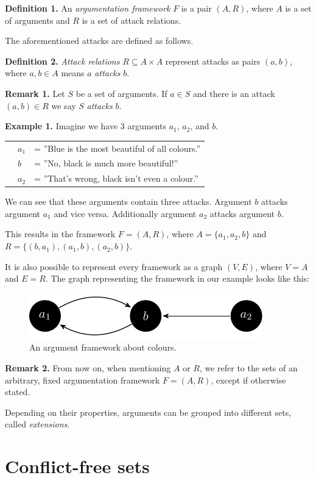 \documentclass[draft,final]{vutinfth} %
\newcommand{\hl}{\par\vspace{6pt}} %
\newcommand{\cl}{\par\vspace{12pt}} %
\begin{document}
\textbf{Definition 1.} An \emph{argumentation framework} $F$ is a pair $(A,R)$, where $A$ is a set of arguments and $R$ is a set of attack relations.\cl

The aforementioned attacks are defined as follows.\hl

\textbf{Definition 2.} \emph{Attack relations} $R\subseteq A\times A$ represent attacks as pairs $(a,b)$, where $a,b\in A$ means $a$ \emph{attacks} $b$.\cl

\textbf{Remark 1.} Let $S$ be a set of arguments. If $a\in S$ and there is an attack $(a,b)\in R$ we say $S$ \emph{attacks} $b$.\cl

\textbf{Example 1.} Imagine we have 3 arguments $a_1$, $a_2$, and $b$.\hl
			\begin{tabular}{p{0.5cm}p{0.5cm}l}
			& $a_1$ & = ''Blue is the most beautiful of all colours.''\\
			& $b$ & = ''No, black is much more beautiful!''\\
			& $a_2$ & = ''That's wrong, black isn't even a colour.''
			\end{tabular}\hl
We can see that these arguments contain three attacks. Argument $b$ attacks argument $a_1$ and vice versa. Additionally argument $a_2$ attacks argument $b$.\hl
This results in the framework $F=(A,R)$, where $A=\{a_1,a_2,b\}$ and $R=\{(b,a_1),(a_1,b),(a_2,b)\}$.\cl

It is also possible to represent every framework as a graph $(V,E)$, where $V=A$ and $E=R$. The graph representing the framework in our example looks like this:

\FloatBarrier
	\begin{figure}[!ht]
		\centering
		\includegraphics[width=\linewidth]{graphs/ex1_v2.pdf}
		\caption{An argument framework about colours.}
	\end{figure}
\FloatBarrier

\textbf{Remark 2.} From now on, when mentioning $A$ or $R$, we refer to the sets of an arbitrary, fixed argumentation framework $F=(A,R)$, except if otherwise stated.\cl

Depending on their properties, arguments can be grouped into different sets, called \emph{extensions}.\cl

\section{Conflict-free sets}
\end{document}
